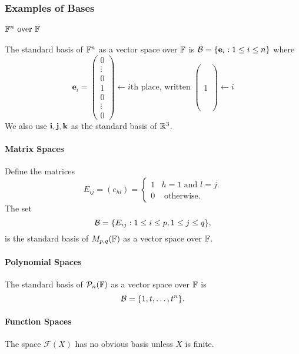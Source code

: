 \subsubsection{Examples of Bases}
\paragraph{\(\mathbb{F}^n \text{ over } \mathbb{F}\)}
The standard basis of \(\mathbb{F}^n\) as a vector space over \(\mathbb{F}\) is \(\mathcal{B} = \{\mathbf{e}_i : 1 \leq i \leq n\}\) where
\[\mathbf{e}_i = \begin{pmatrix}
    0 \\
    \vdots \\
    0 \\
    1 \\
    0 \\
    \vdots \\
    0
\end{pmatrix}
\leftarrow i\text{th place, written }
\begin{pmatrix}
    \phantom{0} \\
    \phantom{0} \\
    1 \\
    \phantom{0} \\
    \phantom{0}
\end{pmatrix}
\leftarrow i
\]
We also use \(\mathbf{i}, \mathbf{j}, \mathbf{k}\) as the standard basis of \(\mathbb{R}^3\).

\paragraph{Matrix Spaces}
Define the matrices 
\[E_{ij} = (e_{hl}) = \begin{cases}
    1 & h = 1 \text{ and } l = j. \\
    0 & \text{ otherwise.}
\end{cases}\]
The set 
\[\mathcal{B} = \{E_{ij} : 1 \leq i \leq p, 1 \leq j \leq q\},\]
is the standard basis of \(M_{p,q}(\mathbb{F})\) as a vector space over \(\mathbb{F}\).

\paragraph{Polynomial Spaces}
The standard basis of \(\mathcal{P}_n(\mathbb{F})\) as a vector space over \(\mathbb{F}\) is 
\[\mathcal{B} = \{1, t, \dots, t^n \}.\]

\paragraph{Function Spaces}
The space \(\mathcal{F}(X)\) has no obvious basis unless \(X\) is finite. 

